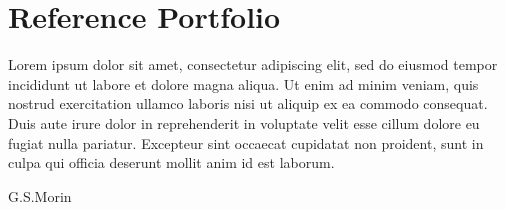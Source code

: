 \documentclass[10pt,letterpaper,sans]{moderncv} %
\begin{document}








\newpage


\section{Reference Portfolio}
\renewcommand{\epigraphsize}{\large}
\setlength{\epigraphwidth}{0.6\textwidth}
\renewcommand{\epigraphflush}{center}
\epigraph{Lorem ipsum dolor sit amet, consectetur adipiscing elit, sed do eiusmod tempor incididunt ut labore et dolore magna aliqua. Ut enim ad minim veniam, quis nostrud exercitation ullamco laboris nisi ut aliquip ex ea commodo consequat. Duis aute irure dolor in reprehenderit in voluptate velit esse cillum dolore eu fugiat nulla pariatur. Excepteur sint occaecat cupidatat non proident, sunt in culpa qui officia deserunt mollit anim id est laborum.}{G.S.Morin}
\end{document}
